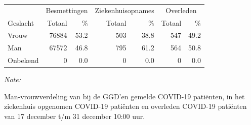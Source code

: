 \documentclass[
  english,
  man,floatsintext]{apa6}
\begin{document}
\begin{table}[H]
\centering\begingroup\fontsize{11}{13}\selectfont

\begin{threeparttable}
\begin{tabular}{lrrrrrr}
\toprule
\multicolumn{1}{c}{ } & \multicolumn{2}{c}{Besmettingen} & \multicolumn{2}{c}{Ziekenhuisopnames} & \multicolumn{2}{c}{Overleden} \\
\cmidrule(l{3pt}r{3pt}){2-3} \cmidrule(l{3pt}r{3pt}){4-5} \cmidrule(l{3pt}r{3pt}){6-7}
Geslacht & Totaal & \% & Totaal & \% & Totaal & \%\\
\midrule
Vrouw & 76884 & 53.2 & 503 & 38.8 & 547 & 49.2\\
Man & 67572 & 46.8 & 795 & 61.2 & 564 & 50.8\\
Onbekend & 0 & 0.0 & 0 & 0.0 & 0 & 0.0\\
\bottomrule
\end{tabular}
\begin{tablenotes}
\item \textit{Note: } 
\item Man-vrouwverdeling van bij de GGD’en gemelde COVID-19 patiënten, in het ziekenhuis opgenomen COVID-19 patiënten en overleden COVID-19 patiënten van 17 december t/m 31 december 10:00 uur.
\end{tablenotes}
\end{threeparttable}
\endgroup{}
\end{table}
\newpage
\end{document}
